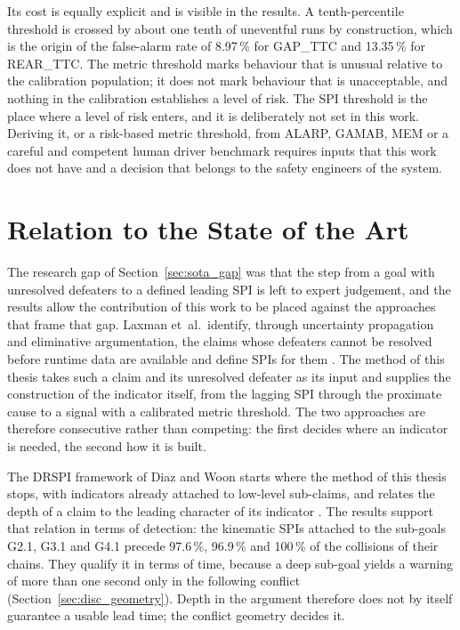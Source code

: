 Its cost is equally explicit and is visible in the results. A tenth-percentile
threshold is crossed by about one tenth of uneventful runs by construction, which
is the origin of the false-alarm rate of 8.97\,\% for GAP\_TTC and 13.35\,\% for
REAR\_TTC. The metric threshold marks behaviour that is unusual relative to the
calibration population; it does not mark behaviour that is unacceptable, and
nothing in the calibration establishes a level of risk. The SPI threshold is
the place where a level of risk enters, and it is deliberately not set in this
work. Deriving it, or a risk-based metric threshold, from ALARP, GAMAB, MEM or a
careful and competent human driver benchmark requires inputs that this work does
not have and a decision that belongs to the safety engineers of the system.

\section{Relation to the State of the Art}
\label{sec:disc_sota}

The research gap of Section~\ref{sec:sota_gap} was that the step from a goal with
unresolved defeaters to a defined leading \ac{SPI} is left to expert judgement, and the results allow
the contribution of this work to be placed against the approaches that frame that
gap. Laxman et~al.\ identify, through uncertainty propagation and eliminative
argumentation, the claims whose defeaters cannot be resolved before runtime data are
available and define \acp{SPI} for them \cite{laxman2025}. The method of this thesis takes such
a claim and its unresolved defeater as its input and supplies the construction of the indicator itself,
from the lagging \ac{SPI} through the proximate cause to a signal with a calibrated
metric threshold. The two approaches are therefore consecutive rather than
competing: the first decides where an indicator is needed, the second how it is
built.

The \ac{DRSPI} framework of Diaz and Woon starts where the method of this thesis
stops, with indicators already attached to low-level sub-claims, and relates the
depth of a claim to the leading character of its indicator \cite{diaz2022drspi}. The
results support that relation in terms of detection: the kinematic \acp{SPI} attached
to the sub-goals G2.1, G3.1 and G4.1 precede 97.6\,\%, 96.9\,\% and 100\,\% of the
collisions of their chains. They qualify it in terms of time, because a deep
sub-goal yields a warning of more than one second only in the following conflict
(Section~\ref{sec:disc_geometry}). Depth in the argument therefore does not by
itself guarantee a usable lead time; the conflict geometry decides it.

